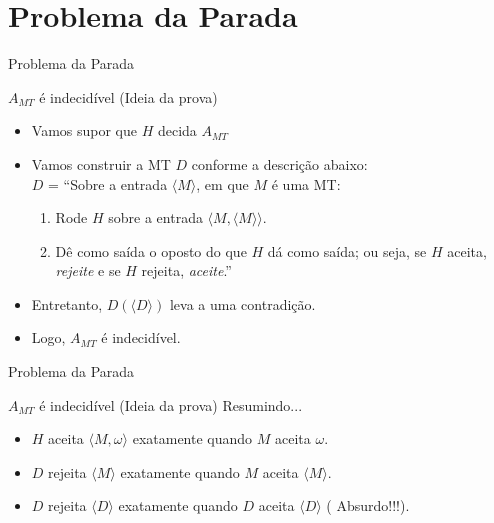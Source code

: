 \documentclass[xcolor=dvipsnames,table]{beamer}
\begin{document}
	\section{Problema da Parada}
	\begin{frame}{Problema da Parada}
		\begin{block}{$A_{MT}$ é indecidível (Ideia da prova)}
			\begin{itemize}
				\item Vamos supor que $H$ decida $A_{MT}$ \pause
				\item Vamos construir a MT $D$ conforme a descrição abaixo:\\ \pause
				$D$ = ``Sobre a entrada $\langle M \rangle$, em que $M$ é uma MT:
				\begin{enumerate}
					\item Rode $H$ sobre a entrada $\langle M, \langle M \rangle \rangle$.
					\item Dê como saída o oposto do que $H$ dá como saída; ou seja, se $H$ aceita, {\it rejeite} e se $H$ rejeita, {\it aceite}.''
				\end{enumerate} \pause
				\item Entretanto, $D(\langle D \rangle)$ leva a uma contradição. \pause
				\item Logo, $A_{MT}$ é indecidível.
			\end{itemize}
		\end{block}
	\end{frame}

	\begin{frame}{Problema da Parada}
		\begin{block}{$A_{MT}$ é indecidível (Ideia da prova)}
			Resumindo... \pause
			\begin{itemize}
				\item $H$ aceita $\langle M, \omega \rangle$ exatamente quando $M$ aceita $\omega$. \pause
				\item $D$ rejeita $\langle M \rangle$ exatamente quando $M$ aceita $\langle M \rangle$. \pause
				\item $D$ rejeita $\langle D \rangle$ exatamente quando $D$ aceita $\langle D \rangle$ ({\color{red} Absurdo!!!}).
			\end{itemize}
		\end{block}
	\end{frame}
\end{document}
